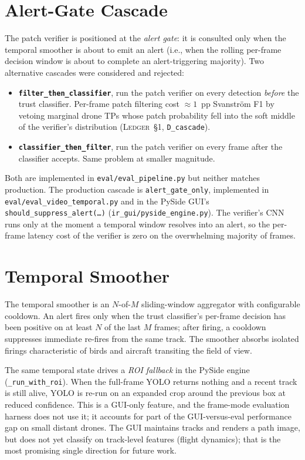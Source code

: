 \documentclass[12pt,a4paper,oneside,openright]{book}
\begin{document}
\section{Alert-Gate Cascade}
\label{sec:alert_gate}

The patch verifier is positioned at the \emph{alert gate}: it is consulted only when the temporal smoother is about to emit an alert (i.e., when the rolling per-frame decision window is about to complete an alert-triggering majority). Two alternative cascades were considered and rejected:

\begin{itemize}
    \item \textbf{\texttt{filter\_then\_classifier}}, run the patch verifier on every detection \emph{before} the trust classifier. Per-frame patch filtering cost $\approx 1$~pp Svanstr\"om F1 by vetoing marginal drone TPs whose patch probability fell into the soft middle of the verifier's distribution (\textsc{Ledger}~\S1, \texttt{D\_cascade}).
    \item \textbf{\texttt{classifier\_then\_filter}}, run the patch verifier on every frame after the classifier accepts. Same problem at smaller magnitude.
\end{itemize}

Both are implemented in \texttt{eval/eval\_pipeline.py} but neither matches production. The production cascade is \texttt{alert\_gate\_only}, implemented in \texttt{eval/eval\_video\_temporal.py} and in the PySide GUI's \texttt{should\_suppress\_alert(\dots)} (\texttt{ir\_gui/pyside\_engine.py}). The verifier's CNN runs only at the moment a temporal window resolves into an alert, so the per-frame latency cost of the verifier is zero on the overwhelming majority of frames.

\section{Temporal Smoother}
\label{sec:temporal}

The temporal smoother is an $N$-of-$M$ sliding-window aggregator with configurable cooldown. An alert fires only when the trust classifier's per-frame decision has been positive on at least $N$ of the last $M$ frames; after firing, a cooldown suppresses immediate re-fires from the same track. The smoother absorbs isolated firings characteristic of birds and aircraft transiting the field of view.

The same temporal state drives a \emph{ROI fallback} in the PySide engine (\texttt{\_run\_with\_roi}). When the full-frame YOLO returns nothing and a recent track is still alive, YOLO is re-run on an expanded crop around the previous box at reduced confidence. This is a GUI-only feature, and the frame-mode evaluation harness does not use it; it accounts for part of the GUI-versus-eval performance gap on small distant drones. The GUI maintains tracks and renders a path image, but does not yet classify on track-level features (flight dynamics); that is the most promising single direction for future work.
\end{document}
